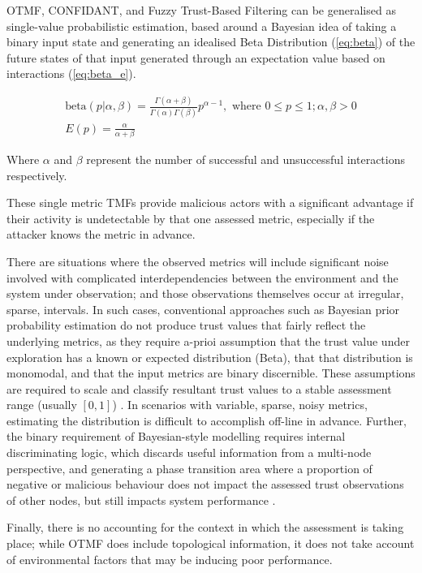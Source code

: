 \documentclass[runningheads,a4paper]{llncs}
\begin{document}
OTMF, CONFIDANT, and Fuzzy Trust-Based Filtering can be generalised as single-value probabilistic estimation, based around a Bayesian idea of taking a binary input state and generating an idealised Beta Distribution (\ref{eq:beta}) of the future states of that input generated through an expectation value based on interactions (\ref{eq:beta_e}).

\begin{align}
  \label{eq:beta}
  \text{beta}(p|\alpha,\beta) = \frac{\Gamma(\alpha + \beta)}{\Gamma(\alpha)\Gamma(\beta)}p^{\alpha-1},\text{ where } 0 \leq p \leq 1; \alpha,\beta > 0\\
  \label{eq:beta_e}
  E(p) = \frac{\alpha}{\alpha + \beta}
\end{align}

Where $\alpha$ and $\beta$ represent the number of successful and unsuccessful interactions respectively.

These single metric TMFs provide malicious actors with a significant advantage if their activity is undetectable by that one assessed metric, especially if the attacker knows the metric in advance.

There are situations where the observed metrics will include significant noise involved with complicated interdependencies between the environment and the system under observation; and those observations themselves occur at irregular, sparse, intervals.
In such cases, conventional approaches such as Bayesian prior probability estimation do not produce trust values that fairly reflect the underlying metrics, as they require a-prioi assumption that the trust value under exploration has a known or expected distribution (Beta), that that distribution is monomodal, and that the input metrics are binary discernible.
These assumptions are required to scale and classify resultant trust values to a stable assessment range (usually $[0,1]$) \cite{Liu2006}.
In scenarios with variable, sparse, noisy metrics, estimating the distribution is difficult to accomplish off-line in advance.
Further, the binary requirement of Bayesian-style modelling requires internal discriminating logic, which discards useful information from a multi-node perspective, and generating a phase transition area where a proportion of negative or malicious behaviour does not impact the assessed trust observations of other nodes, but still impacts system performance \cite{Mundinger2008}. 

Finally, there is no accounting for the context in which the assessment is taking place; while OTMF does include topological information, it does not take account of environmental factors that may be inducing poor performance.
\end{document}
